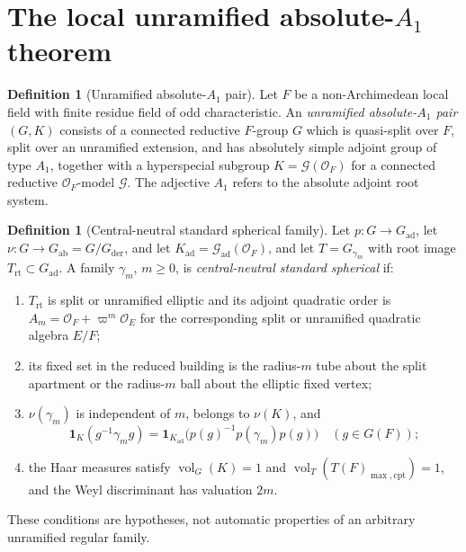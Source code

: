 \documentclass[11pt]{article}
\theoremstyle{definition}
\newtheorem{definition}[theorem]{Definition}
\theoremstyle{remark}
\newcommand{\one}{\mathbf 1}
\newcommand{\rt}{\mathrm{rt}}
\newcommand{\ad}{\mathrm{ad}}
\newcommand{\ab}{\mathrm{ab}}
\newcommand{\der}{\mathrm{der}}
\newcommand{\cO}{\mathcal O}
\newcommand{\vol}{\operatorname{vol}}
\begin{document}
\section{The local unramified absolute-\texorpdfstring{$A_1$}{A1} theorem}
\label{sec:absolute-A1}

\begin{definition}[Unramified absolute-$A_1$ pair]
\label{def:A1-pair}
Let $F$ be a non-Archimedean local field with finite residue field of odd
characteristic.  An \emph{unramified absolute-$A_1$ pair} $(G,K)$ consists of
a connected reductive $F$-group $G$ which is quasi-split over $F$, split over
an unramified extension, and has absolutely simple adjoint group of type
$A_1$, together with a hyperspecial subgroup
$K=\mathcal G(\cO_F)$ for a connected reductive $\cO_F$-model $\mathcal G$.
The adjective $A_1$ refers to the absolute adjoint root system.
\end{definition}

\begin{definition}[Central-neutral standard spherical family]
\label{def:standard-A1-family}
Let $p:G\to G_{\ad}$, let $\nu:G\to G_{\ab}=G/G_{\der}$, and let
$K_{\ad}=\mathcal G_{\ad}(\cO_F)$, and let
$T=G_{\gamma_m}$ with root image $T_{\rt}\subset G_{\ad}$.  A family
$\gamma_m$, $m\ge0$, is \emph{central-neutral standard spherical} if:
\begin{enumerate}[label=\textup{(\alph*)}]
\item $T_{\rt}$ is split or unramified elliptic and its adjoint quadratic
  order is $A_m=\cO_F+\varpi^m\cO_E$ for the corresponding split or
  unramified quadratic algebra $E/F$;
\item its fixed set in the reduced building is the radius-$m$ tube about the
  split apartment or the radius-$m$ ball about the elliptic fixed vertex;
\item $\nu(\gamma_m)$ is independent of $m$, belongs to $\nu(K)$, and
  \begin{equation}
   \one_K(g^{-1}\gamma_mg)
   =\one_{K_{\ad}}\bigl(p(g)^{-1}p(\gamma_m)p(g)\bigr)
   \quad(g\in G(F));
   \label{eq:central-neutral-support}
  \end{equation}
\item the Haar measures satisfy $\vol_G(K)=1$ and
  $\vol_T(T(F)_{\max,\mathrm{cpt}})=1$, and the Weyl discriminant
  has valuation $2m$.
\end{enumerate}
These conditions are hypotheses, not automatic properties of an arbitrary
unramified regular family.
\end{definition}
\end{document}
